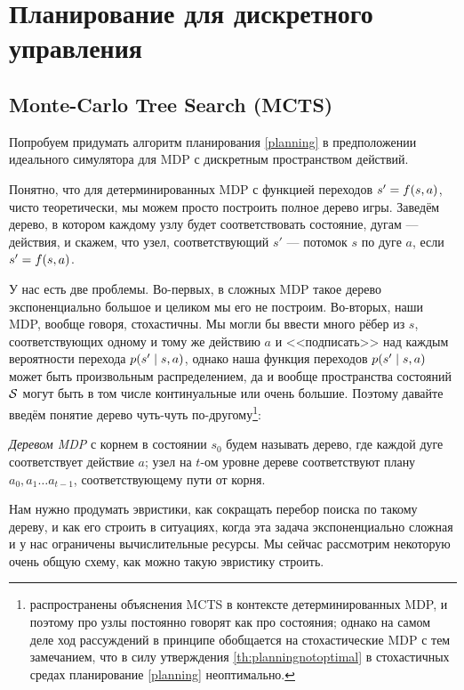 \section{Планирование для дискретного управления}\label{mctssection}

\subsection{Monte-Carlo Tree Search (MCTS)}

Попробуем придумать алгоритм планирования \eqref{planning} в предположении идеального симулятора для MDP с дискретным пространством действий.

Понятно, что для детерминированных MDP с функцией переходов $s' \HM= f(s, a)$, чисто теоретически, мы можем просто построить полное дерево игры. Заведём дерево, в котором каждому узлу будет соответствовать состояние, дугам --- действия, и скажем, что узел, соответствующий $s'$ --- потомок $s$ по дуге $a$, если $s' \HM= f(s, a)$.

У нас есть две проблемы. Во-первых, в сложных MDP такое дерево экспоненциально большое и целиком мы его не построим. Во-вторых, наши MDP, вообще говоря, стохастичны. Мы могли бы ввести много рёбер из $s$, соответствующих одному и тому же действию $a$ и <<подписать>> над каждым вероятности перехода $p(s' \HM\mid s, a)$, однако наша функция переходов $p(s' \HM\mid s, a)$ может быть произвольным распределением, да и вообще пространства состояний $\mathcal{S}$ могут быть в том числе континуальные или очень большие. Поэтому давайте введём понятие дерево чуть-чуть по-другому\footnote{распространены объяснения MCTS в контексте детерминированных MDP, и поэтому про узлы постоянно говорят как про состояния; однако на самом деле ход рассуждений в принципе обобщается на стохастические MDP с тем замечанием, что в силу утверждения \ref{th:planningnotoptimal} в стохастичных средах планирование \eqref{planning} неоптимально.}:

\begin{definition}
\emph{Деревом MDP} с корнем в состоянии $s_0$ будем называть дерево, где каждой дуге соответствует действие $a$; узел на $t$-ом уровне дереве соответствуют плану $a_0, a_1 \dots a_{t-1}$, соответствующему пути от корня.
\end{definition}

Нам нужно продумать эвристики, как сокращать перебор поиска по такому дереву, и как его строить в ситуациях, когда эта задача экспоненциально сложная и у нас ограничены вычислительные ресурсы. Мы сейчас рассмотрим некоторую очень общую схему, как можно такую эвристику строить.

